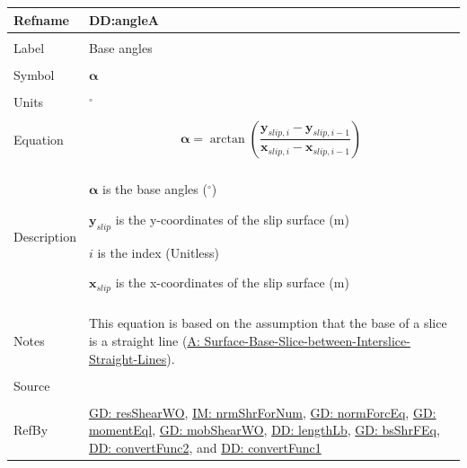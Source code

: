 \documentclass[12pt]{article}
\begin{document}
\noindent \begin{minipage}{\textwidth}
          \begin{tabular}{>{\raggedright}p{}>{\raggedright\arraybackslash}p{}}
          \toprule \textbf{Refname} & \textbf{DD:angleA}
          \label{DD:angleA}
          \\ \midrule \\
          Label & Base angles
          \\ \midrule \\
          Symbol & $\mathbf{α}$
          \\ \midrule \\
          Units & ${}^{\circ}$
          \\ \midrule \\
          Equation & \begin{displaymath}
                     \mathbf{α}=\arctan\left(\frac{{\mathbf{y}_{slip,i}}-{\mathbf{y}_{slip,i-1}}}{{\mathbf{x}_{slip,i}}-{\mathbf{x}_{slip,i-1}}}\right)
                     \end{displaymath}
          \\ \midrule \\
          Description & \begin{symbDescription}
                        \item{$\mathbf{α}$ is the base angles (${}^{\circ}$)}
                        \item{${\mathbf{y}_{slip}}$ is the y-coordinates of the slip surface (m)}
                        \item{$i$ is the index (Unitless)}
                        \item{${\mathbf{x}_{slip}}$ is the x-coordinates of the slip surface (m)}
                        \end{symbDescription}
          \\ \midrule \\
          Notes & This equation is based on the assumption that the base of a slice is a straight line (\hyperref[assumpSBSBISL]{A: Surface-Base-Slice-between-Interslice-Straight-Lines}).
          \\ \midrule \\
          Source & \cite{fredlund1977}
          \\ \midrule \\
          RefBy & \hyperref[GD:resShearWO]{GD: resShearWO}, \hyperref[IM:nrmShrForNum]{IM: nrmShrForNum}, \hyperref[GD:normForcEq]{GD: normForcEq}, \hyperref[GD:momentEql]{GD: momentEql}, \hyperref[GD:mobShearWO]{GD: mobShearWO}, \hyperref[DD:lengthLb]{DD: lengthLb}, \hyperref[GD:bsShrFEq]{GD: bsShrFEq}, \hyperref[DD:convertFunc2]{DD: convertFunc2}, and \hyperref[DD:convertFunc1]{DD: convertFunc1}
          \\ \bottomrule
          \end{tabular}
          \end{minipage}
\par~
\end{document}
